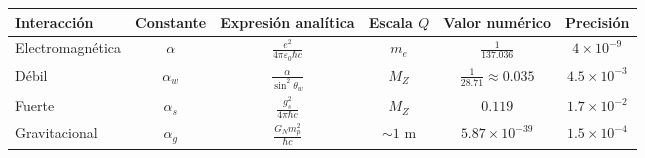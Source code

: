 \begin{problema}
\begin{center}
\small
\begin{tabular}{lccccc}
\hline\hline
\textbf{Interacción} & \textbf{Constante} & \textbf{Expresión analítica} & \textbf{Escala $Q$} & \textbf{Valor numérico} & \textbf{Precisión} \\
\hline
Electromagnética & $\alpha$ & $\frac{e^2}{4\pi\varepsilon_0\hbar c}$ & $m_e$ & $\frac{1}{137.036}$ & $4 \times 10^{-9}$ \\
Débil & $\alpha_w$ & $\frac{\alpha}{\sin^2\theta_w}$ & $M_Z$ & $\frac{1}{28.71} \approx 0.035$ & $4.5 \times 10^{-3}$ \\
Fuerte & $\alpha_s$ & $\frac{g_s^2}{4\pi\hbar c}$ & $M_Z$ & $0.119$ & $1.7 \times 10^{-2}$ \\
Gravitacional & $\alpha_g$ & $\frac{G_N m_p^2}{\hbar c}$ & $\sim 1\text{ m}$ & $5.87 \times 10^{-39}$ & $1.5 \times 10^{-4}$ \\
\hline\hline
\end{tabular}
\end{center}
\end{problema}